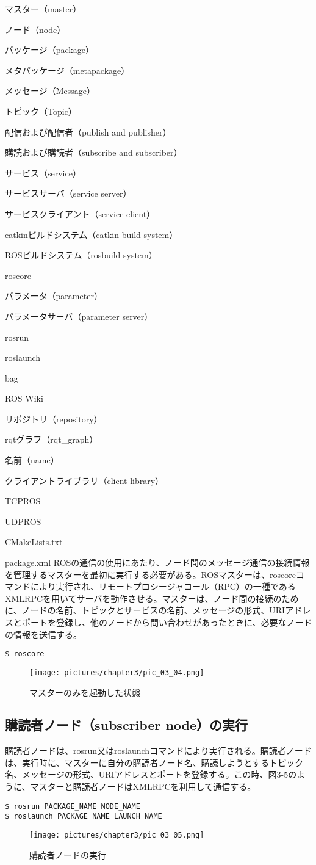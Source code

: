 \begin{term}{マスター（master）}
\begin{term}{ノード（node）}
\begin{term}{パッケージ（package）}
\begin{term}{メタパッケージ（metapackage）}
\begin{term}{メッセージ（Message）}
\begin{term}{トピック（Topic）}
\begin{term}{配信および配信者（publish and publisher）}
\begin{term}{購読および購読者（subscribe and subscriber）}
\begin{term}{サービス（service）}
\begin{term}{サービスサーバ（service server）}
\begin{term}{サービスクライアント（service client）}
\begin{term}{catkinビルドシステム（catkin build system）}
\begin{term}{ROSビルドシステム（rosbuild system）}
\begin{term}{roscore}
\begin{term}{パラメータ（parameter）}
\begin{term}{パラメータサーバ（parameter server）}
\begin{term}{rosrun}
\begin{term}{roslaunch}
\begin{term}{bag}
\begin{term}{ROS Wiki}
\begin{term}{リポジトリ（repository）}
\begin{term}{rqtグラフ（rqt\_graph）}
\begin{term}{名前（name）}
\begin{term}{クライアントライブラリ（client library）}
\begin{term}{TCPROS}
\begin{term}{UDPROS}
\begin{term}{CMakeLists.txt}
\begin{term}{package.xml}
ROSの通信の使用にあたり、ノード間のメッセージ通信の接続情報を管理するマスターを最初に実行する必要がある。ROSマスターは、roscoreコマンドにより実行され、リモートプロシージャコール（RPC）の一種であるXMLRPCを用いてサーバを動作させる。マスターは、ノード間の接続のために、ノードの名前、トピックとサービスの名前、メッセージの形式、URIアドレスとポートを登録し、他のノードから問い合わせがあったときに、必要なノードの情報を送信する。

\begin{lstlisting}[language=ROS]
$ roscore
\end{lstlisting}

\begin{figure}[h]
  \centering
  \texttt{[image: pictures/chapter3/pic\_03\_04.png]}
  \caption{マスターのみを起動した状態}
\end{figure}

\subsection{購読者ノード（subscriber node）の実行}

購読者ノードは、rosrun又はroslaunchコマンドにより実行される。購読者ノードは、実行時に、マスターに自分の購読者ノード名、購読しようとするトピック名、メッセージの形式、URIアドレスとポートを登録する。この時、図3-5のように、マスターと購読者ノードはXMLRPCを利用して通信する。

\begin{lstlisting}[language=ROS]
$ rosrun PACKAGE_NAME NODE_NAME
$ roslaunch PACKAGE_NAME LAUNCH_NAME
\end{lstlisting}

\begin{figure}[h]
  \centering
  \texttt{[image: pictures/chapter3/pic\_03\_05.png]}
  \caption{購読者ノードの実行}
\end{figure}


\end{term}
\end{term}
\end{term}
\end{term}
\end{term}
\end{term}
\end{term}
\end{term}
\end{term}
\end{term}
\end{term}
\end{term}
\end{term}
\end{term}
\end{term}
\end{term}
\end{term}
\end{term}
\end{term}
\end{term}
\end{term}
\end{term}
\end{term}
\end{term}
\end{term}
\end{term}
\end{term}
\end{term}
